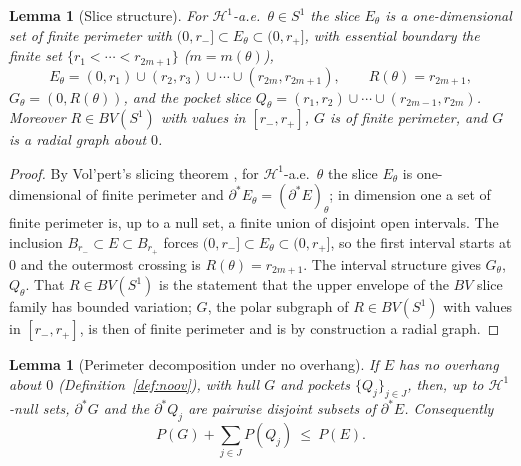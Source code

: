 \documentclass[11pt]{article}
\newtheorem{lemma}[theorem]{Lemma}
\theoremstyle{definition}
\newcommand{\HH}{\mathcal H}
\begin{document}
\begin{lemma}[Slice structure]\label{lem:slice}
For $\HH^1$-a.e.\ $\theta\in S^1$ the slice $E_\theta$ is a
one-dimensional set of finite perimeter with
$(0,r_-]\subset E_\theta\subset(0,r_+]$, with essential boundary the
finite set $\{r_1<\cdots<r_{2m+1}\}$ ($m=m(\theta)$),
\[
   E_\theta=(0,r_1)\cup(r_2,r_3)\cup\cdots\cup(r_{2m},r_{2m+1}),\qquad
   R(\theta)=r_{2m+1},
\]
$G_\theta=(0,R(\theta))$, and the pocket slice
$Q_\theta=(r_1,r_2)\cup\cdots\cup(r_{2m-1},r_{2m})$. Moreover $R\in
BV(S^1)$ with values in $[r_-,r_+]$, $G$ is of finite perimeter, and $G$
is a radial graph about $0$.
\end{lemma}

\begin{proof}
By Vol'pert's slicing theorem \cite[Thm.~3.108]{AFP}, for $\HH^1$-a.e.\
$\theta$ the slice $E_\theta$ is one-dimensional of finite perimeter and
$\partial^*E_\theta=(\partial^*E)_\theta$; in dimension one a set of finite
perimeter is, up to a null set, a finite union of disjoint open intervals.
The inclusion $B_{r_-}\subset E\subset B_{r_+}$ forces
$(0,r_-]\subset E_\theta\subset(0,r_+]$, so the first interval starts at
$0$ and the outermost crossing is $R(\theta)=r_{2m+1}$. The interval
structure gives $G_\theta$, $Q_\theta$. That $R\in BV(S^1)$ is the
statement that the upper envelope of the $BV$ slice family has bounded
variation; $G$, the polar subgraph of $R\in BV(S^1)$ with values in
$[r_-,r_+]$, is then of finite perimeter and is by construction a radial
graph.
\end{proof}

\begin{lemma}[Perimeter decomposition under no overhang]\label{lem:perim}
If $E$ has no overhang about $0$ (Definition~\ref{def:noov}), with hull
$G$ and pockets $\{Q_j\}_{j\in J}$, then, up to $\HH^1$-null sets,
$\partial^*G$ and the $\partial^*Q_j$ are pairwise disjoint subsets of
$\partial^*E$. Consequently
\begin{equation}\label{eq:perim-dec}
   P(G)+\sum_{j\in J}P(Q_j)\ \le\ P(E).
\end{equation}
\end{lemma}
\end{document}
